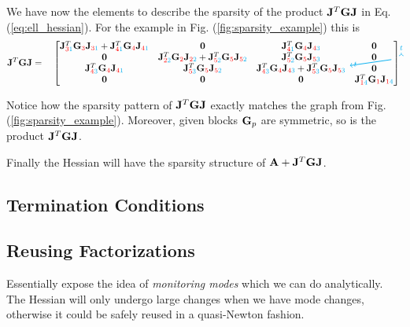 We have now the elements to describe the sparsity of the product
${\mathbf{J}}^T{\mathbf{G}}{\mathbf{J}}$ in Eq. (\ref{eq:ell_hessian}). For the example in Fig.
(\ref{fig:sparsity_example}) this is
\begin{equation}
	\mf{J}^T\mf{G}\mf{J}=\quad
	\begin{bmatrix}
		\tikzmark{JTGJ_topleft}
		\JTGJ{3}{1}{1} + \JTGJ{4}{1}{1} & \mf{0} & \JTGJ{4}{1}{3} & \mf{0}
		\tikzmark{JTGJ_topright}\\		
		\mf{0} & \JTGJ{2}{2}{2} + \JTGJ{5}{2}{2} & \JTGJ{5}{2}{3} & \mf{0}\\
		\JTGJ{4}{3}{1} & \JTGJ{5}{3}{2} & \JTGJ{4}{3}{3} + \JTGJ{5}{3}{3} & \mf{0}\\
		\tikzmark{JTGJ_bottomleft}
		\mf{0} & \mf{0} & \mf{0} & \JTGJ{1}{4}{4}\\
	\end{bmatrix}
	\label{eq:JTGJ_sparsity}
\tikz[overlay,remember picture] {
	\draw[->,thick,color=cyan]
  ([yshift=3ex]JTGJ_topleft) -- ([yshift=3ex]JTGJ_topright) node[midway,above]
  {\scriptsize $t$}; 
  \draw[->,thick,color=cyan]
  ([yshift=1.5ex,xshift=-2.5ex]JTGJ_topleft) -- ([xshift=-13ex]JTGJ_bottomleft)
  node[near end,left] {\scriptsize $t$};}	
\end{equation}

Notice how the sparsity pattern of ${\mathbf{J}}^T{\mathbf{G}}{\mathbf{J}}$ exactly matches the
graph from Fig. (\ref{fig:sparsity_example}). Moreover, given blocks ${\mathbf{G}}_p$
are symmetric, so is the product ${\mathbf{J}}^T{\mathbf{G}}{\mathbf{J}}$.

Finally the Hessian will have the sparsity structure of ${\mathbf{A}} +
{\mathbf{J}}^T{\mathbf{G}}{\mathbf{J}}$. 


\subsection{Termination Conditions}

\subsection{Reusing Factorizations}
Essentially expose the idea of \textit{monitoring modes} which we can do
analytically. The Hessian will only undergo large changes when we have mode
changes, otherwise it could be safely reused in a quasi-Newton fashion.
